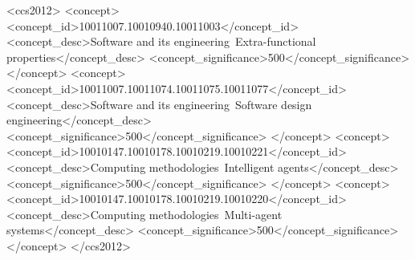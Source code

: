 \documentclass[sigconf,nonacm]{acmart}
\begin{document}
\begin{abstract}
The emergence of agentic AI and LLM-based multi-agent systems (MAS) presents unprecedented opportunities for automating complex tasks, while simultaneously raising critical concerns about the preservation of fundamental human-centered values, such as privacy, fairness, and safety.
Although software engineering has traditionally focused on functional correctness, the adoption of LLMs and AI agents into complex socio-technical systems has intensified the need for responsible software engineering and robust value alignment.
In MAS, architectural design decisions, such as coordination mechanisms, communication protocols, and system topologies, play a central role in shaping system behavior and the outcomes they produce.
This paper argues that architectural choices influence not only the functionality and performance of MAS but can also promote value-oriented system behavior.
Therefore, we investigate how different architectural designs support different human-centered values, discussing the following value-preserving architectural patterns: (i)~a privacy-aware architecture with a federated topology, (ii)~a distributed architecture to promote pluralism and diversity, and (iii)~a guard-agent architecture to detect and mitigate unfairness.
Finally, we introduce representative use cases to illustrate the proposed architectures in real-world scenarios.
By linking architectural design with human-centered values, this work lays the foundation for a unified set of architectural patterns and guidelines towards the design of trustworthy MAS.
\end{abstract}

\begin{CCSXML}
<ccs2012>
   <concept>
       <concept_id>10011007.10010940.10011003</concept_id>
       <concept_desc>Software and its engineering~Extra-functional properties</concept_desc>
       <concept_significance>500</concept_significance>
       </concept>
   <concept>
       <concept_id>10011007.10011074.10011075.10011077</concept_id>
       <concept_desc>Software and its engineering~Software design engineering</concept_desc>
       <concept_significance>500</concept_significance>
       </concept>
   <concept>
       <concept_id>10010147.10010178.10010219.10010221</concept_id>
       <concept_desc>Computing methodologies~Intelligent agents</concept_desc>
       <concept_significance>500</concept_significance>
       </concept>
   <concept>
       <concept_id>10010147.10010178.10010219.10010220</concept_id>
       <concept_desc>Computing methodologies~Multi-agent systems</concept_desc>
       <concept_significance>500</concept_significance>
       </concept>
 </ccs2012>
\end{CCSXML}
\end{document}
